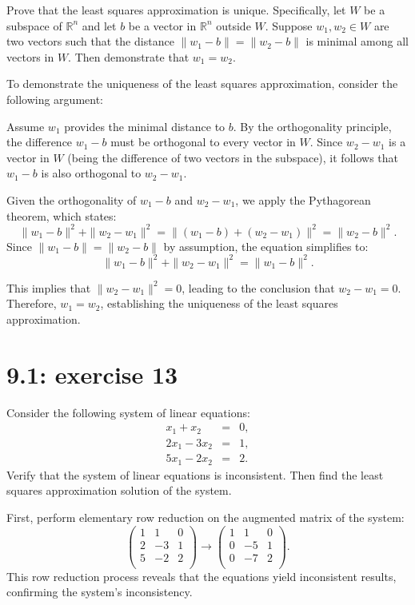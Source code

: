 \documentclass{report}
\begin{document}
Prove that the least squares approximation is unique. Specifically, let \( W \) be a subspace of \( \mathbb{R}^n \) and let \( b \) be a vector in \( \mathbb{R}^n \) outside \( W \). Suppose \( w_1, w_2 \in W \) are two vectors such that the distance \( \|w_1 - b\| = \|w_2 - b\| \) is minimal among all vectors in \( W \). Then demonstrate that \( w_1 = w_2 \).


\sol

To demonstrate the uniqueness of the least squares approximation, consider the following argument:


Assume \( w_1 \) provides the minimal distance to \( b \). By the orthogonality principle, the difference \( w_1 - b \) must be orthogonal to every vector in \( W \). Since \( w_2 - w_1 \) is a vector in \( W \) (being the difference of two vectors in the subspace), it follows that \( w_1 - b \) is also orthogonal to \( w_2 - w_1 \).


Given the orthogonality of \( w_1 - b \) and \( w_2 - w_1 \), we apply the Pythagorean theorem, which states:
\[
\|w_1 - b\|^2 + \|w_2 - w_1\|^2 = \|(w_1 - b) + (w_2 - w_1)\|^2 = \|w_2 - b\|^2.
\]
Since \( \|w_1 - b\| = \|w_2 - b\| \) by assumption, the equation simplifies to:
\[
\|w_1 - b\|^2 + \|w_2 - w_1\|^2 = \|w_1 - b\|^2.
\]


This implies that \( \|w_2 - w_1\|^2 = 0 \), leading to the conclusion that \( w_2 - w_1 = 0 \). Therefore, \( w_1 = w_2 \), establishing the uniqueness of the least squares approximation. \\



\section*{9.1: exercise 13} 

Consider the following system of linear equations:
\[
\begin{array}{rcc}
x_1 + x_2 &=& 0, \\
2x_1 - 3x_2 &=& 1, \\
5x_1 - 2x_2 &=& 2.
\end{array}
\]
Verify that the system of linear equations is inconsistent. Then find the least squares approximation solution of the system.


\sol


First, perform elementary row reduction on the augmented matrix of the system:
\[
\left(
\begin{array}{cc|c}
1 & 1 & 0 \\
2 & -3 & 1 \\
5 & -2 & 2 \\
\end{array}
\right) \to \left(
\begin{array}{cc|c}
1 & 1 & 0 \\
0 & -5 & 1 \\
0 & -7 & 2 \\
\end{array}
\right).
\]
This row reduction process reveals that the equations yield inconsistent results, confirming the system's inconsistency.
\end{document}

